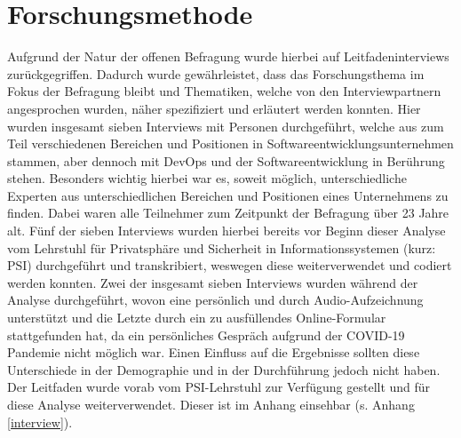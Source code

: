 \chapter{Forschungsmethode} %
\label{Research} %

Aufgrund der Natur der offenen Befragung wurde hierbei auf Leitfadeninterviews zurückgegriffen. Dadurch wurde gewährleistet, dass das Forschungsthema im Fokus der Befragung bleibt und Thematiken, welche von 
den Interviewpartnern angesprochen wurden, näher spezifiziert und erläutert werden konnten. Hier wurden insgesamt sieben Interviews mit Personen durchgeführt, welche aus zum Teil verschiedenen Bereichen und
Positionen in Softwareentwicklungsunternehmen stammen, aber dennoch mit DevOps und der Softwareentwicklung in Berührung stehen. \newline \newline
Besonders wichtig hierbei war es, soweit möglich, unterschiedliche Experten aus unterschiedlichen Bereichen und Positionen eines Unternehmens zu finden. Dabei waren alle Teilnehmer zum Zeitpunkt der Befragung 
über 23 Jahre alt. Fünf der sieben Interviews wurden hierbei bereits vor Beginn dieser Analyse vom Lehrstuhl für Privatsphäre und Sicherheit in Informationssystemen (kurz: PSI) durchgeführt und transkribiert, 
weswegen diese weiterverwendet und codiert werden konnten. Zwei der insgesamt sieben Interviews wurden während der Analyse durchgeführt, wovon eine persönlich und durch Audio-Aufzeichnung unterstützt und die 
Letzte durch ein zu ausfüllendes Online-Formular stattgefunden hat, da ein persönliches Gespräch aufgrund der COVID-19 Pandemie nicht möglich war. Einen Einfluss auf die Ergebnisse sollten diese Unterschiede 
in der Demographie und in der Durchführung jedoch nicht haben. \newline Der Leitfaden wurde vorab vom PSI-Lehrstuhl zur Verfügung gestellt und für diese Analyse weiterverwendet. Dieser ist im Anhang einsehbar 
(s. Anhang \ref{interview}).

